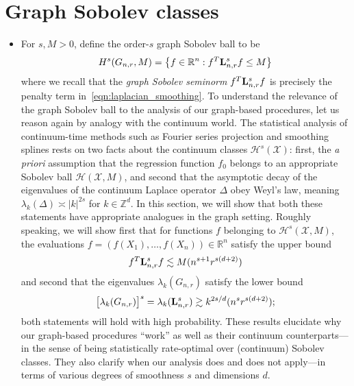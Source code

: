 \documentclass{article}
\newcommand{\Reals}{\mathbb{R}}
\newcommand{\abs}[1]{\left \lvert #1 \right \rvert}
\newcommand{\set}[1]{\left\{#1\right\}}
\newcommand{\1}{\mathbf{1}}
\newcommand{\Lap}{{\bf L}}
\newcommand{\Xset}{\mathcal{X}}
\newcommand{\mc}[1]{\mathcal{#1}}
\theoremstyle{alden}
\theoremstyle{aldenthm}
\theoremstyle{definition}
\theoremstyle{remark}
\begin{document}
\section{Graph Sobolev classes}
\label{sec:graph_sobolev_classes}

\begin{itemize}
	\item For $s,M > 0$, define the order-$s$ graph Sobolev ball to be
	\begin{equation}
	\label{eqn:graph_sobolev_ball}
	H^s(G_{n,r},M) = \set{f \in \Reals^n: f^T \Lap_{n,r}^s f \leq M}
	\end{equation}
	where we recall that the \emph{graph Sobolev seminorm} $f^T \Lap_{{n,r}}^s f$ is precisely the penalty term in~\eqref{eqn:laplacian_smoothing}. 
	To understand the relevance of the graph Sobolev ball to the analysis of our graph-based procedures, let us reason again by analogy with the continuum world. The statistical analysis of continuum-time methods such as Fourier series projection and smoothing splines rests on two facts about the continuum classes $\mc{H}^s(\Xset)$: first, the \textit{a priori} assumption that the regression function $f_0$ belongs to an appropriate Sobolev ball $\mc{H}(\Xset,M)$, and second that the asymptotic decay of the eigenvalues of the continuum Laplace operator $\Delta$ obey Weyl's law, meaning $\lambda_k(\Delta) \asymp \abs{k}^{2s}$ for $k \in \mathbb{Z}^d$. In this section, we will show that both these statements have appropriate analogues in the graph setting. Roughly speaking, we will show first that for functions $f$ belonging to $\mc{H}^s(\Xset, M)$, the evaluations $f = (f(X_1),\ldots,f(X_n)) \in \Reals^n$ satisfy the upper bound
	\begin{equation}
	\label{eqn:graph_sobolev_seminorm_asymptotic}
	f^T \Lap_{n,r}^s f \lesssim M(n^{s + 1}r^{s(d + 2)})
	\end{equation}
	and second that the eigenvalues $\lambda_k(G_{n,r})$ satisfy the lower bound
	\begin{equation*}
	\bigl[\lambda_k(G_{n,r})\bigr]^s = \lambda_k(\Lap_{{n,r}}^s) \gtrsim k^{2s/d} (n^s r^{s(d + 2)});
	\end{equation*}
	both statements will hold with high probability. These results elucidate why our graph-based procedures ``work'' as well as their continuum counterparts---in the sense of being statistically rate-optimal over (continuum) Sobolev classes. They also clarify when our analysis does and does not apply---in terms of various degrees of smoothness $s$ and dimensions $d$.
\end{itemize}
\end{document}
